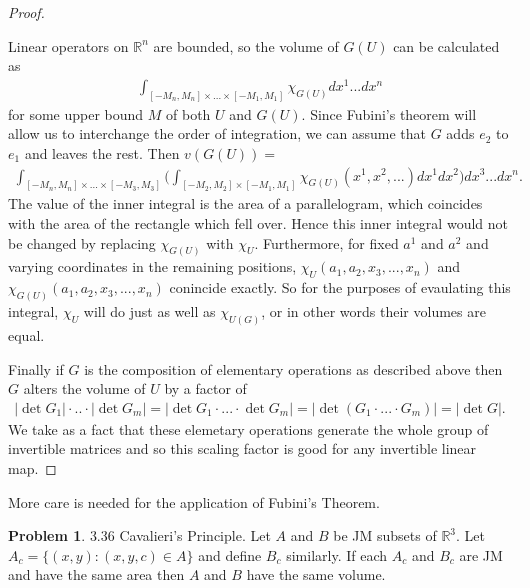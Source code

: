 \documentclass[20pt]{article}
\theoremstyle{plain}
\theoremstyle{definition}
\newtheorem*{problem}{Problem}
\newcommand{\reals}{\mathbb{R}}
\begin{document}
\begin{proof}
\begin{enumerate}
     Linear operators on $\mathbb{R}^n$ are bounded, so the volume of $G(U)$
     can be calculated as
     \begin{align*}
       \int_{[-M_n, M_n]\times...\times [-M_1,M_1]}\chi_{G(U)}dx^1...dx^n
     \end{align*}
     for some upper bound $M$ of both $U$ and $G(U)$.  Since Fubini's theorem will allow us to interchange
     the order of integration, we can assume that $G$
     adds $e_2$ to $e_1$ and leaves the rest. Then $v(G(U)) = $
     \begin{align*}
       \int_{[-M_n, M_n]\times...\times[-M_3, M_3]} \bigg(
          \int_{[-M_2,M_2]\times[-M_1,M_1]} \chi_{G(U)}(x^1, x^2, ...)dx^1dx^2
        \bigg) dx^3...dx^n.
     \end{align*}
     The value of the inner integral is the area of a parallelogram, which
     coincides with the area of the rectangle which fell over.  Hence this inner integral
     would not be changed by replacing $\chi_{G(U)}$ with $\chi_U.$
     Furthermore, for fixed $a^1$ and $a^2$ and varying coordinates in the
     remaining positions, $\chi_U(a_1, a_2, x_3, ..., x_n)$ and
     $\chi_{G(U)}(a_1, a_2, x_3, ..., x_n)$ conincide exactly.
     So for the purposes of evaulating this integral, $\chi_U$ will do
     just as well as $\chi_{U(G)}$, or in other words their volumes are equal.

     \end{enumerate}

     Finally if $G$ is the composition of elementary operations as described above
     then $G$ alters the volume of $U$ by a factor of
     \begin{align*}
        |\det G_1| \cdot .. \cdot |\det G_m| =
        |\det G_1 \cdot ... \cdot \det G_m | =
        |\det (G_1 \cdot ... \cdot G_m) | = |\det G|.
     \end{align*}
     We take as a fact that these elemetary operations generate the whole group
     of invertible matrices and so this scaling factor is good for any invertible linear map.
\end{proof}
\color{Blue}
More care is needed for the application of Fubini's Theorem.
\color{Black}




\begin{problem}{3.36 Cavalieri's Principle.}
    Let $A$ and $B$ be JM subsets of $\reals^3$.
    Let $A_c = \{(x, y): (x, y, c) \in A\}$ and define $B_c$ similarly.
    If each $A_c$ and $B_c$ are JM  and have the same area then $A$ and $B$
    have the same volume.
\end{problem}
\end{document}
